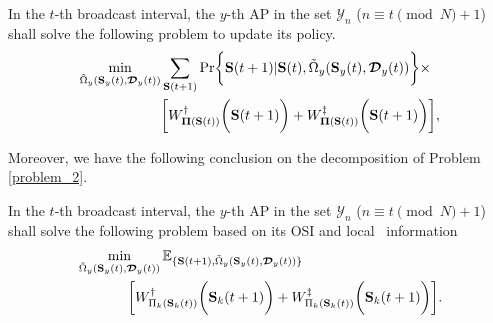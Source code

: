 \begin{problem}[]
    In the $t$-th broadcast interval, the $y$-th AP in the set $\mathcal{Y}_{n}$ ($n \equiv t \pmod{N} + 1$) shall solve the following problem to update its policy.
    {\small
    \begin{align}
        \min_{ \tilde{\Omega}_{y}(\Stat_{y}(t),\Delay_{y}(t)) }
        &\sum_{\Stat(t+1)} \Pr\Brace{
            \Stat(t+1) | \Stat(t), \tilde{\Omega}_{y}(\Stat_{y}(t),\Delay_{y}(t))
        } \times
        \nonumber\\
        &\Bracket{
            W^{\AP}_{\Baseline(\Stat(t))} \Paren{\Stat(t+1)} +
            W^{\ES}_{\Baseline(\Stat(t))} \Paren{\Stat(t+1)}
        },
    \end{align}
    }
    \label{problem_2}
\end{problem}

Moreover, we have the following conclusion on the decomposition of Problem \ref{problem_2}.
\begin{lemma}
\end{lemma}

\begin{problem}[]
    In the $t$-th broadcast interval, the $y$-th AP in the set $\mathcal{Y}_{n}$ ($n \equiv t \pmod{N} + 1$) shall solve the following problem based on its OSI and local \brlatency~information
    {\small
    \begin{align}
        &\min_{\tilde{\Omega}_{y}(\mathbf{S}_{y}(t),\boldsymbol{\mathcal{D}}_{y}(t))}
        \mathbb{E}_{\{\mathbf{S}(t+1), \tilde{\Omega}_{y}(\mathbf{S}_{y}(t),\boldsymbol{\mathcal{D}}_{y}(t))\}}
        \nonumber\\
        &~~~~~~~~~~~\bigg[
            W^{\dagger}_{ \Pi_{k}(\mathbf{S}_{k}(t)) }\bigg(\mathbf{S}_{k}(t+1)\bigg) +
            W^{\ddagger}_{ \Pi_{k}(\mathbf{S}_{k}(t)) }\bigg(\mathbf{S}_{k}(t+1)\bigg)
        \bigg].
        \label{eqn:partial}
    \end{align}
    }
    \label{problem_3}
\end{problem}


